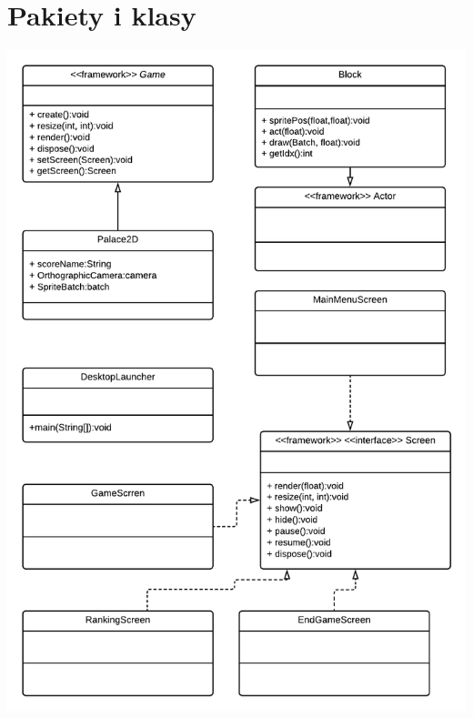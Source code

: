 \documentclass{article}
\begin{document}
\section{Pakiety i klasy}
\begin{center}
    \includegraphics[scale=0.3]{logicalview.png}
\end{center}
\end{document}
